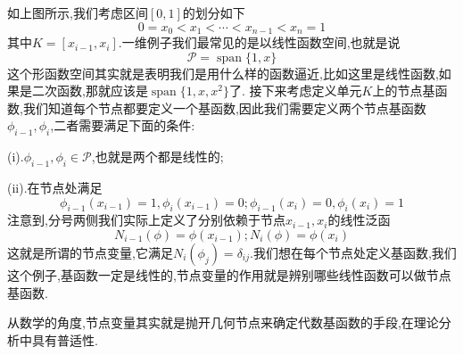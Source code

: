 \begin{center}
\end{center}
如上图所示,我们考虑区间$[0,1]$的划分如下
$$
0=x_0<x_1<\cdots<x_{n-1}<x_n=1
$$
其中$K=[x_{i-1},x_i]$.一维例子我们最常见的是以线性函数空间,也就是说
$$
\mathcal{P}=\operatorname{span}\{1,x\}
$$
这个形函数空间其实就是表明我们是用什么样的函数逼近,比如这里是线性函数,如果是二次函数,那就应该是$\operatorname{span}\{1,x,x^2\}$了.
接下来考虑定义单元$K$上的节点基函数,我们知道每个节点都要定义一个基函数,因此我们需要定义两个节点基函数$\phi_{i-1},\phi_{i}$,二者需要满足下面的条件:\par
(i).$\phi_{i-1},\phi_{i}\in\mathcal{P}$,也就是两个都是线性的;\par
(ii).在节点处满足
$$
\phi_{i-1}(x_{i-1})=1,\phi_{i}(x_{i-1})=0;\phi_{i-1}(x_i)=0,\phi_{i}(x_i)=1
$$
注意到,分号两侧我们实际上定义了分别依赖于节点$x_{i-1},x_i$的线性泛函
$$
N_{i-1}(\phi)=\phi(x_{i-1});N_{i}(\phi)=\phi(x_i)
$$
这就是所谓的节点变量,它满足$N_i(\phi_j)=\delta_{ij}$.我们想在每个节点处定义基函数,我们这个例子,基函数一定是线性的,节点变量的作用就是辨别哪些线性函数可以做节点基函数.\par
从数学的角度,节点变量其实就是抛开几何节点来确定代数基函数的手段,在理论分析中具有普适性.\par
